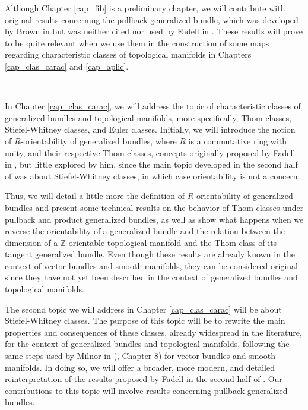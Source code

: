 \documentclass[12pt,oneside]{book}
\newcommand{\Z}{\mathbb{Z}}
\begin{document}
    Although Chapter \ref{cap_fib} is a preliminary chapter, we will contribute with original results 
    concerning the pullback generalized bundle, which was developed by Brown in \cite{brown} but was 
    neither cited nor used by Fadell in \cite{fadell_1}. These results will prove to be quite relevant 
    when we use them in the construction of some maps regarding characteristic classes of topological 
    manifolds in Chapters \ref{cap_clas_carac} and \ref{cap_aplic}.

    \

    In Chapter \ref{cap_clas_carac}, we will address the topic of characteristic classes of generalized 
    bundles and topological manifolds, more specifically, Thom classes, Stiefel-Whitney classes, and 
    Euler classes. Initially, we will introduce the notion of $R$-orientability of generalized bundles, 
    where $R$ is a commutative ring with unity, and their respective Thom classes, concepts originally 
    proposed by Fadell in \cite{fadell_1}, but little explored by him, since the main topic developed 
    in the second half of \cite{fadell_1} was about Stiefel-Whitney classes, in which case orientability 
    is not a concern.

    Thus, we will detail a little more the definition of $R$-orientability of generalized bundles and 
    present some technical results on the behavior of Thom classes under pullback and product generalized 
    bundles, as well as show what happens when we reverse the orientability of a generalized bundle and 
    the relation between the dimension of a $\Z$-orientable topological manifold and the Thom class of 
    its tangent generalized bundle. Even though these results are already known in the context of vector 
    bundles and smooth manifolds, they can be considered original since they have not yet been described 
    in the context of generalized bundles and topological manifolds.

    The second topic we will address in Chapter \ref{cap_clas_carac} will be about Stiefel-Whitney 
    classes. The purpose of this topic will be to rewrite the main properties and consequences of these 
    classes, already widespread in the literature, for the context of generalized bundles and topological 
    manifolds, following the same steps used by Milnor in (\cite{milnor_1}, Chapter 8) for vector bundles 
    and smooth manifolds. In doing so, we will offer a broader, more modern, and detailed reinterpretation 
    of the results proposed by Fadell in the second half of \cite{fadell_1}. Our contributions to this 
    topic will involve results concerning pullback generalized bundles.
\end{document}
